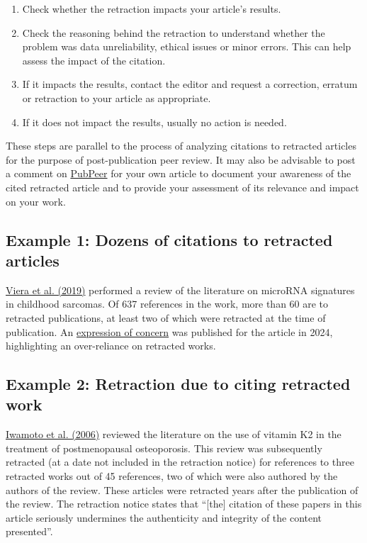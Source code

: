 \documentclass[letterpaper, 12pt]{article}
\begin{document}
\begin{enumerate}
    \setlength\itemsep{-0.5em}
    \item Check whether the retraction impacts your article's results.
    \item Check the reasoning behind the retraction to understand whether the problem was data unreliability, ethical issues or minor errors. This can help assess the impact of the citation.
    \item If it impacts the results, contact the editor and request a correction, erratum or retraction to your article as appropriate.
    \item If it does not impact the results, usually no action is needed.%
\end{enumerate}

These steps are parallel to the process of analyzing citations to retracted articles for the purpose of post-publication peer review. It may also be advisable to post a comment on \href{https://pubpeer.com/}{PubPeer} for your own article to document your awareness of the cited retracted article and to provide your assessment of its relevance and impact on your work.

\subsection*{Example 1: Dozens of citations to retracted articles}
\href{https://pubpeer.com/publications/091398A80C9DE06FBDDF5CF0560D42}{Viera et al. (2019)} performed a review of the literature on microRNA signatures in childhood sarcomas. Of 637 references in the work, more than 60 are to retracted publications, at least two of which were retracted at the time of publication. An \href{https://doi.org/10.1007/s12094-024-03518-0}{expression of concern} was published for the article in 2024, highlighting an over-reliance on retracted works.
\subsection*{Example 2: Retraction due to citing retracted work}
\href{https://pubpeer.com/publications/55DFD29ACF3F3398E4B89037104883}{Iwamoto et al. (2006)} reviewed the literature on the use of vitamin K2 in the treatment of postmenopausal osteoporosis. This review was subsequently retracted (at a date not included in the retraction notice) for references to three retracted works out of 45 references, two of which were also authored by the authors of the review. These articles were retracted years after the publication of the review. The retraction notice states that ``[the] citation of these papers in this article seriously undermines the authenticity and integrity of the content presented''.
\end{document}
